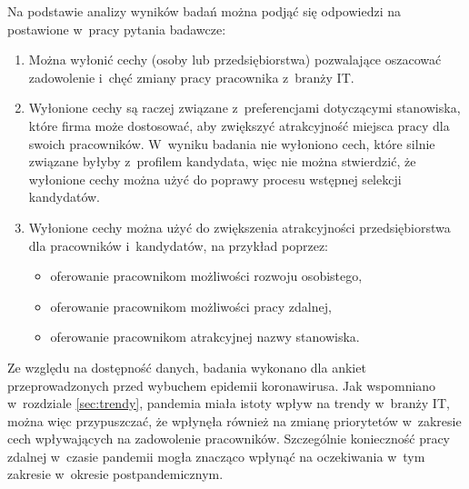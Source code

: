 Na podstawie analizy wyników badań można podjąć się odpowiedzi na postawione w~pracy pytania badawcze:
\begin{enumerate}
    \item Można wyłonić cechy (osoby lub przedsiębiorstwa) pozwalające oszacować zadowolenie i~chęć zmiany pracy pracownika z~branży IT.
    \item Wyłonione cechy są raczej związane z~preferencjami dotyczącymi stanowiska, które firma może dostosować, aby zwiększyć atrakcyjność miejsca pracy dla swoich pracowników. W~wyniku badania nie wyłoniono cech, które silnie związane byłyby z~profilem kandydata, więc nie można stwierdzić, że wyłonione cechy można użyć do poprawy procesu wstępnej selekcji kandydatów.
    \item Wyłonione cechy można użyć do zwiększenia atrakcyjności przedsiębiorstwa dla pracowników i~kandydatów, na przykład poprzez:
    \begin{itemize}
        \item oferowanie pracownikom możliwości rozwoju osobistego,
        \item oferowanie pracownikom możliwości pracy zdalnej,
        \item oferowanie pracownikom atrakcyjnej nazwy stanowiska.
        \end{itemize}
\end{enumerate}

Ze względu na dostępność danych, badania wykonano dla ankiet przeprowadzonych przed wybuchem epidemii koronawirusa.
Jak wspomniano w~rozdziale \ref{sec:trendy}, pandemia miała istoty wpływ na trendy w~branży IT,
można więc przypuszczać, że wpłynęła również na zmianę priorytetów w~zakresie cech wpływających na zadowolenie pracowników.
Szczególnie konieczność pracy zdalnej w~czasie pandemii mogła znacząco wpłynąć na oczekiwania w~tym zakresie w~okresie postpandemicznym.

